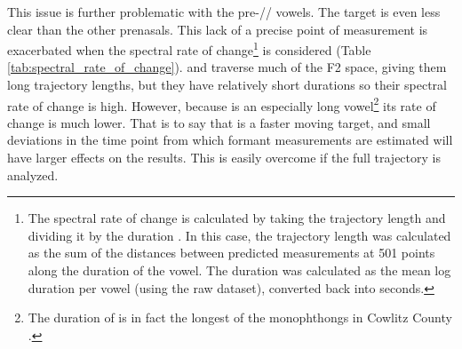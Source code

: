 This issue is further problematic with the pre-// vowels. The target is even less clear than the other prenasals. This lack of a precise point of measurement is exacerbated when the spectral rate of change\footnote{The spectral rate of change is calculated by taking the trajectory length and dividing it by the duration \citep{fox_jacewicz_2009, farrington_etal_2018}. In this case, the trajectory length was calculated as the sum of the distances between predicted measurements at 501 points along the duration of the vowel. The duration was calculated as the mean log duration per vowel (using the raw dataset), converted back into seconds.} is considered (Table \ref{tab:spectral_rate_of_change}). \bing and \bang traverse much of the F2 space, giving them long trajectory lengths, but they have relatively short durations so their spectral rate of change is high. However, because \bat is an especially long vowel\footnote{The duration of \bat is in fact the longest of the monophthongs in Cowlitz County \citep[cf.][]{peterson_lehiste_1960}.} its rate of change is much lower. That is to say that \bang is a faster moving target, and small deviations in the time point from which formant measurements are estimated will have larger effects on the results. This is easily overcome if the full trajectory is analyzed.

